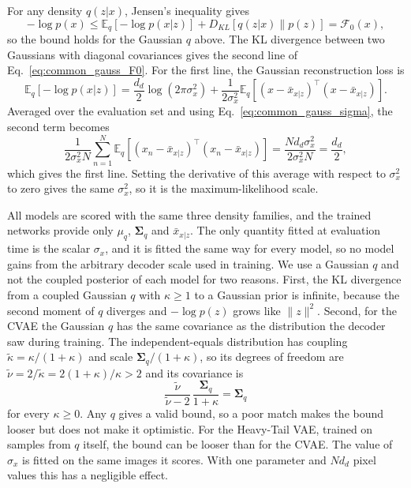 \documentclass[twoside,11pt]{article}
\renewenvironment{proof}{\par\noindent{\bf Proof\ }}{\hfill\BlackBox\par\vspace{2mm}}
\begin{document}
\begin{proof}
For any density $q(z|x)$, Jensen's inequality gives
\begin{equation}
-\log p(x)\leq\mathbb{E}_{q}\left[-\log p(x|z)\right]+D_{KL}\left[q(z|x)\parallel p(z)\right]=\mathcal{F}_0(x),
\end{equation}
so the bound holds for the Gaussian $q$ above. The KL divergence between two Gaussians with diagonal covariances gives the second line of Eq.~\eqref{eq:common_gauss_F0}. For the first line, the Gaussian reconstruction loss is
\begin{equation}
\mathbb{E}_{q}\left[-\log p(x|z)\right]=\frac{d_d}{2}\log\left(2\pi\sigma_x^2\right)+\frac{1}{2\sigma_x^2}\mathbb{E}_q\left[\left(x-\bar{x}_{x|z}\right)^{\intercal}\left(x-\bar{x}_{x|z}\right)\right].
\end{equation}
Averaged over the evaluation set and using Eq.~\eqref{eq:common_gauss_sigma}, the second term becomes
\begin{equation}
\frac{1}{2\sigma_x^2 N}\sum_{n=1}^{N}\mathbb{E}_{q}\left[\left(x_n-\bar{x}_{x|z}\right)^{\intercal}\left(x_n-\bar{x}_{x|z}\right)\right]=\frac{N d_d\sigma_x^2}{2\sigma_x^2 N}=\frac{d_d}{2},
\end{equation}
which gives the first line. Setting the derivative of this average with respect to $\sigma_x^2$ to zero gives the same $\sigma_x^2$, so it is the maximum-likelihood scale.
\end{proof}

All models are scored with the same three density families, and the trained networks provide only $\mu_q$, $\boldsymbol{\Sigma}_q$ and $\bar{x}_{x|z}$. The only quantity fitted at evaluation time is the scalar $\sigma_x$, and it is fitted the same way for every model, so no model gains from the arbitrary decoder scale used in training. We use a Gaussian $q$ and not the coupled posterior of each model for two reasons. First, the KL divergence from a coupled Gaussian $q$ with $\kappa\geq1$ to a Gaussian prior is infinite, because the second moment of $q$ diverges and $-\log p(z)$ grows like $\|z\|^2$. Second, for the CVAE the Gaussian $q$ has the same covariance as the distribution the decoder saw during training. The independent-equals distribution has coupling $\tilde{\kappa}=\kappa/(1+\kappa)$ and scale $\boldsymbol{\Sigma}_q/(1+\kappa)$, so its degrees of freedom are $\tilde{\nu}=2/\tilde{\kappa}=2(1+\kappa)/\kappa>2$ and its covariance is
\begin{equation}
\frac{\tilde{\nu}}{\tilde{\nu}-2}\,\frac{\boldsymbol{\Sigma}_q}{1+\kappa}=\boldsymbol{\Sigma}_q
\end{equation}
for every $\kappa\geq0$. Any $q$ gives a valid bound, so a poor match makes the bound looser but does not make it optimistic. For the Heavy-Tail VAE, trained on samples from $q$ itself, the bound can be looser than for the CVAE. The value of $\sigma_x$ is fitted on the same images it scores. With one parameter and $N d_d$ pixel values this has a negligible effect.
\end{document}
